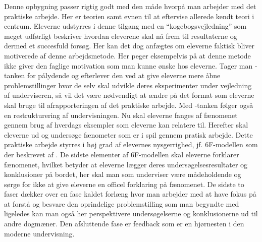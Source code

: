 Denne opbygning passer rigtig godt med den måde hvorpå man arbejder med det praktiske arbejde. Her er teorien samt evnen til at eftervise allerede kendt teori i centrum. Eleverne udstyrres i denne tilgang med en ``kogebogsvejledning'' som meget udførligt beskriver hvordan eleverene skal nå frem til resultaterne og dermed et succesfuld forsøg. Her kan det dog anfægtes om eleverne faktisk bliver motiverede af denne arbejdsmetode. Her peger eksempelvis \citep{Dolin2014} på at denne metode ikke giver den faglige motivation som man kunne ønske hos eleverne. Tager man \ib-tanken for pålydende og efterlever den ved at give eleverne mere åbne problemstillinger hvor de selv skal udvikle deres eksperimenter under vejledning af underviseren, så vil det være nødvendigt at ændre på det format som eleverne skal bruge til afrapporteringen af det praktiske arbejde. Med \ib-tanken følger også en restrukturering af undervisningen. Nu skal eleverne fanges af fænomenet gennem brug af hverdags eksempler som eleverne kan relatere til. Herefter skal eleverne ud og undersøge fænometer som er i spil gennem pratisk arbejde. Dette praktiske arbejde styrres i høj grad af elevernes nysgerrighed,  jf. 6F-modellen som der beskrevet af \citet{Dolin2014}. De sidste elementer af 6F-modellen skal eleverne forklarer fænomenet, hvilket betyder at eleverne lægger deres undersøgelsesresultater og konklusioner på bordet, her skal man som underviser være mådeholdende og sørge for ikke at give eleverne en officel forklaring på fænomenet. De sidste to faser dækker over en fase kaldet forlæng hvor man arbejder med at have fokus på at forstå og besvare den oprindelige problemstilling som man begyndte med ligeledes kan man også her perspektivere undersøgelserne og konklusionerne ud til andre dogmæner. Den afsluttende fase er feedback som er en hjørnesten i den moderne undervisning. 

